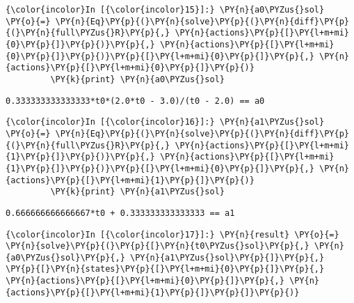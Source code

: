     \begin{Verbatim}[commandchars=\\\{\}]
{\color{incolor}In [{\color{incolor}15}]:} \PY{n}{a0\PYZus{}sol} \PY{o}{=} \PY{n}{Eq}\PY{p}{(}\PY{n}{solve}\PY{p}{(}\PY{n}{diff}\PY{p}{(}\PY{n}{full\PYZus{}R}\PY{p}{,} \PY{n}{actions}\PY{p}{[}\PY{l+m+mi}{0}\PY{p}{]}\PY{p}{)}\PY{p}{,} \PY{n}{actions}\PY{p}{[}\PY{l+m+mi}{0}\PY{p}{]}\PY{p}{)}\PY{p}{[}\PY{l+m+mi}{0}\PY{p}{]}\PY{p}{,} \PY{n}{actions}\PY{p}{[}\PY{l+m+mi}{0}\PY{p}{]}\PY{p}{)}
         \PY{k}{print} \PY{n}{a0\PYZus{}sol}
\end{Verbatim}

    \begin{Verbatim}[commandchars=\\\{\}]
0.333333333333333*t0*(2.0*t0 - 3.0)/(t0 - 2.0) == a0
    \end{Verbatim}

    \begin{Verbatim}[commandchars=\\\{\}]
{\color{incolor}In [{\color{incolor}16}]:} \PY{n}{a1\PYZus{}sol} \PY{o}{=} \PY{n}{Eq}\PY{p}{(}\PY{n}{solve}\PY{p}{(}\PY{n}{diff}\PY{p}{(}\PY{n}{full\PYZus{}R}\PY{p}{,} \PY{n}{actions}\PY{p}{[}\PY{l+m+mi}{1}\PY{p}{]}\PY{p}{)}\PY{p}{,} \PY{n}{actions}\PY{p}{[}\PY{l+m+mi}{1}\PY{p}{]}\PY{p}{)}\PY{p}{[}\PY{l+m+mi}{0}\PY{p}{]}\PY{p}{,} \PY{n}{actions}\PY{p}{[}\PY{l+m+mi}{1}\PY{p}{]}\PY{p}{)}
         \PY{k}{print} \PY{n}{a1\PYZus{}sol}
\end{Verbatim}

    \begin{Verbatim}[commandchars=\\\{\}]
0.666666666666667*t0 + 0.333333333333333 == a1
    \end{Verbatim}

    \begin{Verbatim}[commandchars=\\\{\}]
{\color{incolor}In [{\color{incolor}17}]:} \PY{n}{result} \PY{o}{=} \PY{n}{solve}\PY{p}{(}\PY{p}{[}\PY{n}{t0\PYZus{}sol}\PY{p}{,} \PY{n}{a0\PYZus{}sol}\PY{p}{,} \PY{n}{a1\PYZus{}sol}\PY{p}{]}\PY{p}{,} \PY{p}{[}\PY{n}{states}\PY{p}{[}\PY{l+m+mi}{0}\PY{p}{]}\PY{p}{,} \PY{n}{actions}\PY{p}{[}\PY{l+m+mi}{0}\PY{p}{]}\PY{p}{,} \PY{n}{actions}\PY{p}{[}\PY{l+m+mi}{1}\PY{p}{]}\PY{p}{]}\PY{p}{)}
\end{Verbatim}

